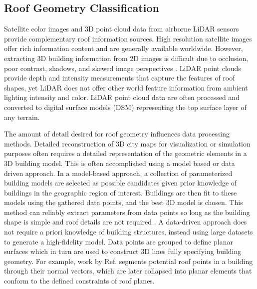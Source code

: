 \subsection{Roof Geometry Classification}


Satellite color images and 3D point cloud data from airborne LiDAR sensors provide complementary roof information sources. High resolution satellite images offer rich information content and are generally available worldwide.  However, extracting 3D building information from 2D images is difficult due to occlusion, poor contrast, shadows, and skewed image perspectives \cite{zhou_seamless_2014}. LiDAR point clouds provide depth and intensity measurements that capture the features of roof shapes, yet LiDAR does not offer other world feature information from ambient lighting intensity and color. LiDAR point cloud data are often processed and converted to digital surface models (DSM) representing the top surface layer of any terrain. 

{The amount of detail desired for roof geometry influences data processing methods. Detailed reconstruction of 3D city maps for visualization or simulation purposes often requires a detailed representation of the geometric elements in a 3D building model.} This is often accomplished using a model based or data driven approach. In a model-based approach, a collection of parameterized building models are selected as possible candidates given prior knowledge of buildings in the geographic region of interest.  Buildings are then fit to these models using the gathered data points, and the best 3D model is chosen. This method can reliably extract parameters from data points so long as the building shape is simple and roof details are not required \cite{haala_update_2010}. A data-driven approach does not require {a    priori} knowledge of building structures, instead using large datasets to generate a high-fidelity model. Data points are grouped to define planar surfaces which in turn are used to construct 3D lines fully specifying building geometry. For example, work by Ref. \cite{jochem_automatic_2009} segments potential roof points in a building through their normal vectors, which are later collapsed into planar elements that conform to the defined constraints of roof planes. 

